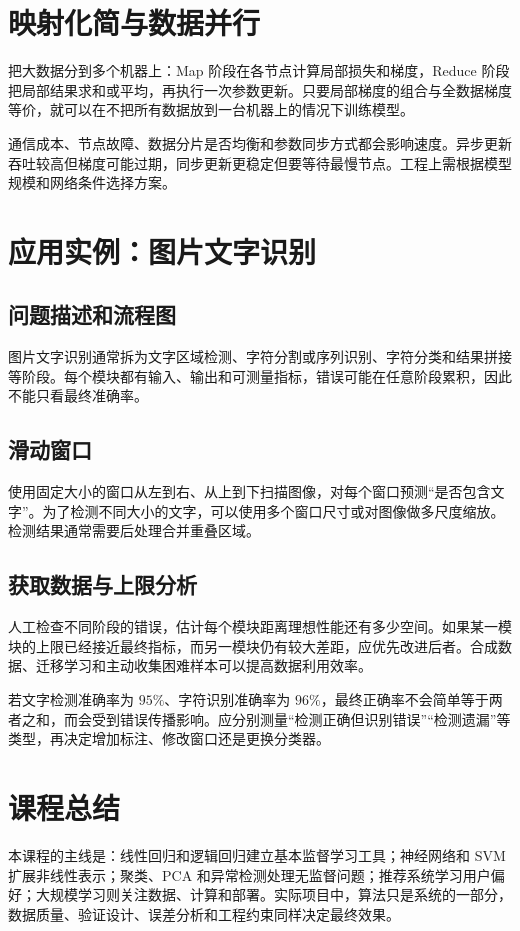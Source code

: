 \section{映射化简与数据并行}
\begin{definitionbox}[MapReduce 思路]
把大数据分到多个机器上：Map 阶段在各节点计算局部损失和梯度，Reduce 阶段把局部结果求和或平均，再执行一次参数更新。只要局部梯度的组合与全数据梯度等价，就可以在不把所有数据放到一台机器上的情况下训练模型。
\end{definitionbox}
\begin{tipbox}[分布式训练注意事项]
通信成本、节点故障、数据分片是否均衡和参数同步方式都会影响速度。异步更新吞吐较高但梯度可能过期，同步更新更稳定但要等待最慢节点。工程上需根据模型规模和网络条件选择方案。
\end{tipbox}

\section{应用实例：图片文字识别}
\subsection{问题描述和流程图}
\begin{keybox}[端到端管道]
图片文字识别通常拆为文字区域检测、字符分割或序列识别、字符分类和结果拼接等阶段。每个模块都有输入、输出和可测量指标，错误可能在任意阶段累积，因此不能只看最终准确率。
\end{keybox}
\subsection{滑动窗口}
\begin{definitionbox}[滑动窗口检测]
使用固定大小的窗口从左到右、从上到下扫描图像，对每个窗口预测“是否包含文字”。为了检测不同大小的文字，可以使用多个窗口尺寸或对图像做多尺度缩放。检测结果通常需要后处理合并重叠区域。
\end{definitionbox}
\subsection{获取数据与上限分析}
\begin{keybox}[数据和人工上限]
人工检查不同阶段的错误，估计每个模块距离理想性能还有多少空间。如果某一模块的上限已经接近最终指标，而另一模块仍有较大差距，应优先改进后者。合成数据、迁移学习和主动收集困难样本可以提高数据利用效率。
\end{keybox}
\begin{examplebox}[误差预算]
若文字检测准确率为 $95\%$、字符识别准确率为 $96\%$，最终正确率不会简单等于两者之和，而会受到错误传播影响。应分别测量“检测正确但识别错误”“检测遗漏”等类型，再决定增加标注、修改窗口还是更换分类器。
\end{examplebox}

\section{课程总结}
\begin{keybox}[从模型到系统]
本课程的主线是：线性回归和逻辑回归建立基本监督学习工具；神经网络和 SVM 扩展非线性表示；聚类、PCA 和异常检测处理无监督问题；推荐系统学习用户偏好；大规模学习则关注数据、计算和部署。实际项目中，算法只是系统的一部分，数据质量、验证设计、误差分析和工程约束同样决定最终效果。
\end{keybox}

